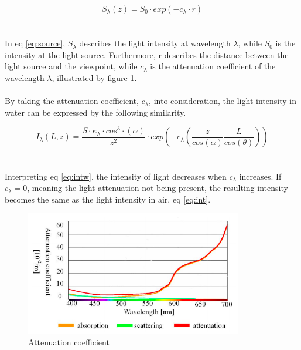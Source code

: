 \begin{equation} \label{eq:source}
S_{\lambda} (z) = S_0 \cdot exp (-c_{\lambda} \cdot r)
\end{equation}
\\\\
In eq \ref{eq:source}, $S_{\lambda}$ describes the light intensity at wavelength $\lambda$, while $S_0$ is the intensity at the light source. Furthermore, r describes the distance between the light source and the viewpoint, while $c_{\lambda}$ is the attenuation coefficient of the wavelength $\lambda$, illustrated by figure \ref{fig:attcoeff}.
\\\\
By taking the attenuation coefficient, $c_{\lambda}$, into consideration, the light intensity in water can be expressed by the following similarity. 

\begin{equation} \label{eq:intw}
    I_ {\lambda} (L, z) = \frac{S \cdot \kappa_{\lambda}\cdot cos^{3}\cdot (\alpha)}{z^2} \cdot exp \left(-c_{\lambda}\left(\frac{z}{cos(\alpha)}\frac{L}{cos(\theta)}\right)\right)
\end{equation}
\\\\
Interpreting eq \ref{eq:intw}, the intensity of light decreases when $c_{\lambda}$ increases. If $c_{\lambda} = 0$, meaning the light attenuation not being present, the resulting intensity becomes the same as the light intensity in air, eq \ref{eq:int}. 

\begin{figure}[H]
\centering
  \includegraphics[width=9.5cm]{Images/theory/attcoeff.png}
  \caption{Attenuation coefficient}
  \label{fig:attcoeff}
\end{figure}




